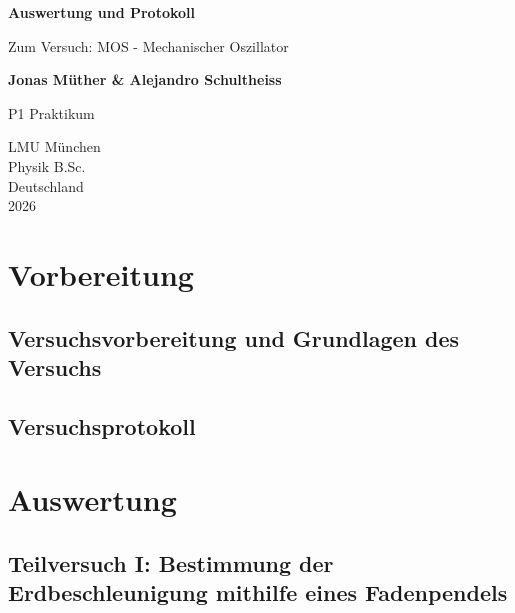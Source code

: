 \documentclass{report}
\begin{document}

\begin{titlepage}
    \begin{center}
        \vspace*{1cm}
            
        \Huge
        \textbf{Auswertung und Protokoll}
            
        \vspace{0.5cm}
        \LARGE
        Zum Versuch: MOS - Mechanischer Oszillator
        
        \vspace{1.8cm}

        \textbf{Jonas Müther \& Alejandro Schultheiss}
        \vfill
            
        P1 Praktikum\\
       
            
        \vspace{0.8cm}
  

        \vspace{1.8cm}
        \Large
        LMU München \\
        Physik B.Sc.\\
        Deutschland\\
        2026
            
    \end{center}
\end{titlepage}
\tableofcontents

\newpage
\chapter{Vorbereitung}

\section{Versuchsvorbereitung und Grundlagen des Versuchs}


\section{Versuchsprotokoll}


\newpage
\chapter{Auswertung}
\section{Teilversuch I: Bestimmung der Erdbeschleunigung mithilfe eines Fadenpendels}
\end{document}

